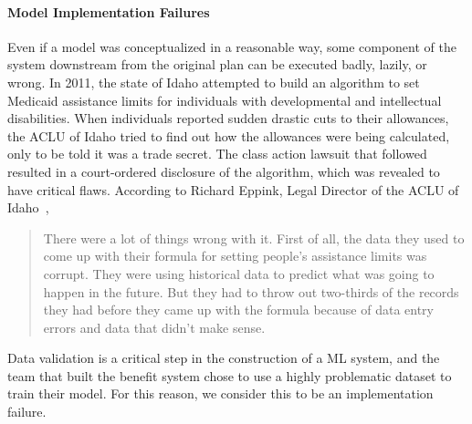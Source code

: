 \documentclass[acmconf,manuscript,screen,natbib=true]{acmart}
\begin{document}
\paragraph{Model Implementation Failures}


Even if a model was conceptualized in a reasonable way, some component of the system downstream from the original plan can be executed badly, lazily, or wrong. In 2011, the state of Idaho attempted to build an algorithm to set Medicaid assistance limits for individuals with developmental and intellectual disabilities. When individuals reported sudden drastic cuts to their allowances, the ACLU of Idaho tried to find out how the allowances were being calculated, only to be told it was a trade secret. The  class action lawsuit that followed resulted in a court-ordered disclosure of the algorithm, which was revealed to have critical flaws. According to Richard Eppink, Legal Director of the ACLU of Idaho~\cite{aclu_idaho},

\blockquote{
There were a lot of things wrong with it.
First of all, the data they used to come up with their formula for setting people’s assistance limits was corrupt. They were using historical data to predict what was going to happen in the future. But they had to throw out two-thirds of the records they had before they came up with the formula because of data entry errors and data that didn’t make sense.}

Data validation is a critical step in the construction of a ML system, and the team that built the benefit system chose to use a highly problematic dataset to train their model. For this reason, we consider this to be an implementation failure.
\end{document}
